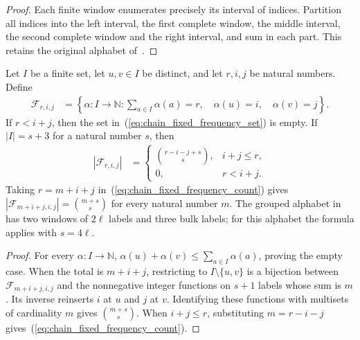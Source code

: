 \begin{proof}\leanok
    Each finite window enumerates precisely its interval of indices.
    Partition all indices into the left interval, the first complete window,
    the middle interval, the second complete window and the right interval,
    and sum in each part. This retains the original alphabet
    of~\cite[eq:H-mid-cut, lines 810--821]{Arad2016RigorousRG}.
\end{proof}

\begin{lemma}
    \label{thm:chain_two_fixed_frequencies}
    \leanok
    Let $I$ be a finite set, let $u,v\in I$ be distinct, and let
    $r,i,j$ be natural numbers. Define
    \begin{align}
        \mathcal F_{r,i,j}
         & =\left\{\alpha:I\to\mathbb N:
        \sum_{a\in I}\alpha(a)=r,\quad
        \alpha(u)=i,\quad\alpha(v)=j\right\}.\label{eq:chain_fixed_frequency_set}
    \end{align}
    If $r<i+j$, then the set in~(\ref{eq:chain_fixed_frequency_set}) is empty.
    If $|I|=s+3$ for a natural number $s$, then
    \begin{align}
        |\mathcal F_{r,i,j}|
         & =\begin{cases}
                \displaystyle\binom{r-i-j+s}{s}, & i+j\le r, \\
                0,                               & r<i+j.
            \end{cases}\label{eq:chain_fixed_frequency_count}
    \end{align}
    Taking $r=m+i+j$ in~(\ref{eq:chain_fixed_frequency_count}) gives
    $|\mathcal F_{m+i+j,i,j}|=\binom{m+s}{s}$
    for every natural number $m$.
    The grouped alphabet in~\cite[Section~4.1]{Arad2016RigorousRG}
    has two windows of $2\ell$ labels and three bulk labels;
    for this alphabet the formula applies with $s=4\ell$.
\end{lemma}

\begin{proof}\leanok
    For every $\alpha:I\to\mathbb N$,
    $\alpha(u)+\alpha(v)\le\sum_{a\in I}\alpha(a)$,
    proving the empty case.
    When the total is $m+i+j$, restricting to $I\setminus\{u,v\}$
    is a bijection between $\mathcal F_{m+i+j,i,j}$ and the
    nonnegative integer functions on $s+1$ labels whose sum is $m$.
    Its inverse reinserts $i$ at $u$ and $j$ at $v$.
    Identifying these functions with multisets of cardinality $m$
    gives $\binom{m+s}{s}$.
    When $i+j\le r$, substituting $m=r-i-j$
    gives~(\ref{eq:chain_fixed_frequency_count}).
\end{proof}

